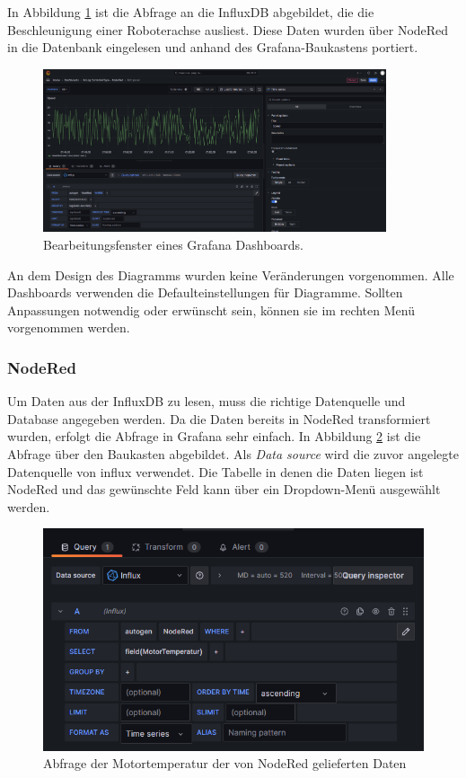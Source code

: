 \documentclass[a4paper, 12pt, oneside, toc=listofnumbered, bibliography=totoc]{scrbook}
\begin{document}
		In Abbildung \ref{fig:GrafanaDiagramm} ist die Abfrage an die InfluxDB abgebildet, die die Beschleunigung einer Roboterachse ausliest. Diese Daten wurden über NodeRed in die Datenbank eingelesen und anhand des Grafana-Baukastens portiert. 
		
		\begin{figure}[H]
			\centering
			\includegraphics[width=0.9\textwidth]{res/Grafana-Diagramm.png}
			\caption{Bearbeitungsfenster eines Grafana Dashboards.}
			\label{fig:GrafanaDiagramm}
		\end{figure}
	
		An dem Design des Diagramms wurden keine Veränderungen vorgenommen. Alle Dashboards verwenden die Defaulteinstellungen für Diagramme. Sollten Anpassungen notwendig oder erwünscht sein, können sie im rechten Menü vorgenommen werden.
		
			\subsubsection{NodeRed}\label{ch:NodeRedGrafana}
			
			Um Daten aus der InfluxDB zu lesen, muss die richtige Datenquelle und Database angegeben werden. Da die Daten bereits in NodeRed transformiert wurden, erfolgt die Abfrage in Grafana sehr einfach. In Abbildung \ref{fig:noderedabfrage} ist die Abfrage über den Baukasten abgebildet. Als \textit{Data source} wird die zuvor angelegte Datenquelle von influx verwendet. Die Tabelle in denen die Daten liegen ist NodeRed und das gewünschte Feld kann über ein Dropdown-Menü ausgewählt werden. 
		
		\begin{figure}[H]
			\centering
			\includegraphics[width=0.9\linewidth]{res/NodeRedAbfrage.png}
			\caption{Abfrage der Motortemperatur der von NodeRed gelieferten Daten}
			\label{fig:noderedabfrage}
		\end{figure}
		
\end{document}
